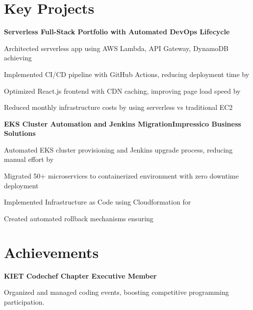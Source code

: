 \documentclass[letterpaper,10pt]{article}
\newcommand{\heading}[2]{
  \hspace{10pt}#1\hfill#2\\
}
\newcommand{\headingBf}[2]{
  \heading{\textbf{#1}}{\textbf{#2}}
}
\newenvironment{resume_list}{
  \vspace{-7pt}
  \begin{itemize}[itemsep=-2px, parsep=1pt, leftmargin=30pt]
}{
  \end{itemize}
}
\begin{document}
\section{Key Projects}

\headingBf{Serverless Full-Stack Portfolio with Automated DevOps Lifecycle \href{https://github.com/1md3nd/portfolio}{\small\textit{\color{gray}{[GitHub]}}}}{}
\begin{resume_list}
\item Architected serverless app using AWS Lambda, API Gateway, DynamoDB achieving \textbf{\color{accentTitle}{99.99\% uptime}}
\item Implemented CI/CD pipeline with GitHub Actions, reducing deployment time by \textbf{\color{accentTitle}{80\% (30min to 6min)}}
\item Optimized React.js frontend with CDN caching, improving page load speed by \textbf{\color{accentTitle}{65\%}}
\item Reduced monthly infrastructure costs by \textbf{\color{accentTitle}{75\%}} using serverless vs traditional EC2
\end{resume_list}

\headingBf{EKS Cluster Automation and Jenkins Migration}{Impressico Business Solutions}
\begin{resume_list}
\item Automated EKS cluster provisioning and Jenkins upgrade process, reducing manual effort by \textbf{\color{accentTitle}{80\%}}
\item Migrated 50+ microservices to containerized environment with zero downtime deployment
\item Implemented Infrastructure as Code using Cloudformation for \textbf{\color{accentTitle}{reproducible environments}}
\item Created automated rollback mechanisms ensuring \textbf{\color{accentTitle}{99.9\% deployment success rate}}
\end{resume_list}

\section{Achievements}
\headingBf{KIET Codechef Chapter Executive Member}{}
\begin{resume_list}
  \item Organized and managed coding events, boosting competitive programming participation.
\end{resume_list}
\end{document}
